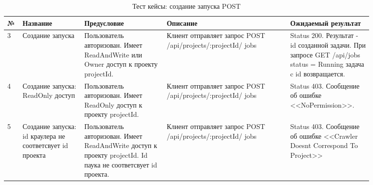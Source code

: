 \documentclass[a4paper,12pt]{article}
\begin{document}
	\begin{table}[hbt]
		\centering
		\begin{tabular}{|p{0.02\linewidth}|p{0.15\linewidth}|p{0.2\linewidth}|p{0.3\linewidth}|p{0.2\linewidth}|} 
			\hline
			\textbf{№} & \textbf{Название} & \textbf{Предусловие} & \textbf{Описание} & \textbf{Ожидаемый результат} \\ \hline
	3 & Создание запуска & Пользователь авторизован. Имеет ReadAndWrite или Owner доступ к проекту projectId.	& Клиент отправляет запрос POST     /api/projects/:projectId/ jobs & Status 200. Результат - id созданной задачи. При запросе GET /api/jobs status = Running задача c id возвращается. \\ \hline
	
	4 & Создание запуска: ReadOnly доступ & Пользователь авторизован. Имеет ReadOnly доступ к проекту projectId. & Клиент отправляет запрос POST     /api/projects/:projectId/ jobs & Status 403. Сообщение об ошибке <<NoPermission>>. \\ \hline
	
	5 & Создание запуска: id краулера не соответсвует id проекта & Пользователь авторизован. Имеет ReadAndWrite доступ к проекту projectId. Id паука не соответсвует id проекта. & Клиент отправляет запрос POST     /api/projects/:projectId/ jobs & Status 403. Сообщение об ошибке <<Crawler Doesnt Correspond To Project>> \\ \hline
	
	\end{tabular}
	\caption{Тест кейсы: создание запуска POST}
	\end{table} 
	
\end{document}
